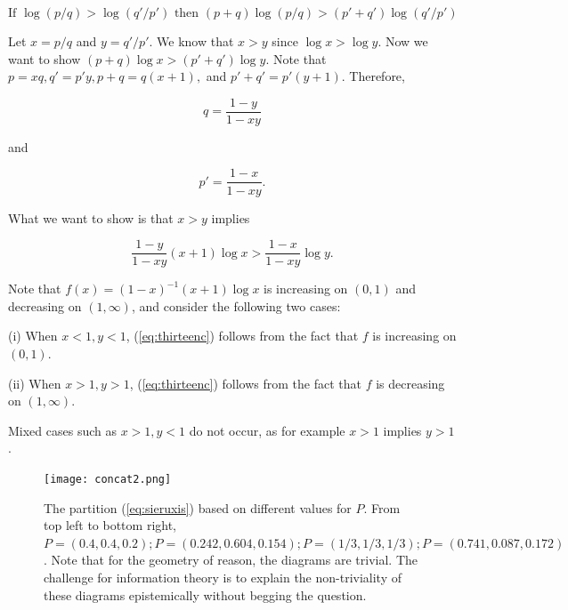 \documentclass[phd,12pt,oneside]{ubcthesis}
\begin{document}
\begin{equation}
  \label{eq:lemma}
  \mbox{If }\log(p/q)>\log(q'/p')\mbox{ then }(p+q)\log(p/q)>(p'+q')\log(q'/p')
\end{equation}

{\noindent}Let $x=p/q$ and $y=q'/p'$. We know that $x>y$ since $\log{}x>\log{}y$.
Now we want to show $(p+q)\log{}x>(p'+q')\log{}y$. Note that
$p=xq,q'=p'y,p+q=q(x+1),$ and $p'+q'=p'(y+1)$. Therefore,

\begin{equation}
  \label{eq:thirteena}
  q=\frac{1-y}{1-xy}
\end{equation}

{\noindent}and

\begin{equation}
  \label{eq:thirteenb}
  p'=\frac{1-x}{1-xy}.
\end{equation}

{\noindent}What we want to show is that $x>y$ implies

\begin{equation}
  \label{eq:thirteenc}
  \frac{1-y}{1-xy}(x+1)\log{}x>\frac{1-x}{1-xy}\log{}y.
\end{equation}

{\noindent}Note that $f(x)=(1-x)^{-1}(x+1)\log{}x$ is increasing on $(0,1)$ and
decreasing on $(1,\infty{})$, and consider the following two cases:

(i) When $x<1,y<1$, (\ref{eq:thirteenc}) follows from the fact that
$f$ is increasing on $(0,1)$.

(ii) When $x>1,y>1$, (\ref{eq:thirteenc}) follows from the fact that
$f$ is decreasing on $(1,\infty)$.

{\noindent}Mixed cases such as $x>1,y<1$ do not occur, as for example $x>1$
implies $y>1$.

\begin{figure}[ht!]
    \begin{minipage}[h]{\linewidth}
      \texttt{[image: concat2.png]}
      \caption{\footnotesize The partition (\ref{eq:sieruxis}) based
        on different values for $P$. From top left to bottom right,
        $P=(0.4,0.4,0.2); P=(0.242,0.604,0.154); P=(1/3,1/3,1/3);
        P=(0.741,0.087,0.172)$.
        Note that for the geometry of reason, the diagrams are
        trivial. The challenge for information theory is to explain
        the non-triviality of these diagrams epistemically without
        begging the question.}
      \label{fig:concat}
    \end{minipage}
\end{figure}
\end{document}
